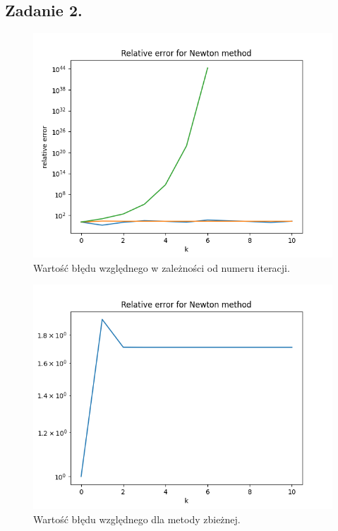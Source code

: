 \documentclass[11pt]{scrartcl}
\begin{document}
    \subsection{Zadanie 2.}
    \begin{figure}[H]
        \centering
        \includegraphics[width=0.8\linewidth]
            {g_relative_error.png}
        \caption{Wartość błędu względnego w zależności od
            numeru iteracji.}
    \end{figure}
    \begin{figure}[H]
        \centering
        \includegraphics[width=0.8\linewidth]
            {g_convergent.png}
        \caption{Wartość błędu względnego dla metody
            zbieżnej.}
    \end{figure}
\end{document}
